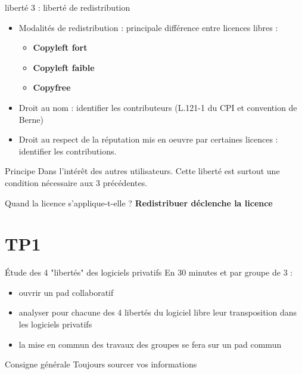 \documentclass{beamer}
\begin{document}
\begin{frame}{liberté 3 : liberté de redistribution}
  \begin{itemize}
  \item Modalités de redistribution : principale différence entre licences libres :
    \begin{itemize}
    \item \textbf{Copyleft fort}
    \item \textbf{Copyleft faible}
    \item \textbf{Copyfree}
    \end{itemize}
  \item Droit au nom : identifier les contributeurs (L.121-1 du CPI et convention de Berne)
  \item Droit au respect de la réputation mis en oeuvre par certaines licences : identifier les contributions.
  \end{itemize}
\begin{alertblock}{Principe}
    Dans l'intérêt des autres utilisateurs. Cette liberté est surtout une condition nécessaire aux 3 précédentes.
  \end{alertblock}

\begin{alertblock}{Quand la licence s'applique-t-elle ?}
\textbf{Redistribuer déclenche la licence}
 \end{alertblock}
\end{frame}

\section{TP1}

\begin{frame}{Étude des 4 "libertés" des logiciels privatifs}
  En 30 minutes et par groupe de 3 :
  \begin{itemize}
  \item ouvrir un pad collaboratif
  \item analyser pour chacune des 4 libertés du logiciel libre leur transposition dans les logiciels privatifs
  \item la mise en commun des travaux des groupes se fera sur un pad commun
  \end{itemize}

  \begin{alertblock}{Consigne générale}
    Toujours sourcer vos informations    
  \end{alertblock}
\end{frame}
\end{document}
